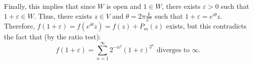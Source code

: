 Finally, this implies that since $W$ is open and $1\in W$, there exists $\varepsilon > 0$ such that $1+\varepsilon \in W$. Thus, there exists $z \in V$ and $\theta = 2\pi \frac{k}{2^m}$ such that $1+\varepsilon = e^{i\theta} z$. Therefore, $f(1+\varepsilon) = f(e^{i\theta} z) = f(z) + P_m(z)$ exists, but this contradicts the fact that (by the ratio test):
\[ f(1+\varepsilon) = \sum_{n = 1}^{\infty} 2^{-n^2} (1+\varepsilon)^{2^n}\mbox{ diverges to $\infty$.} \] 